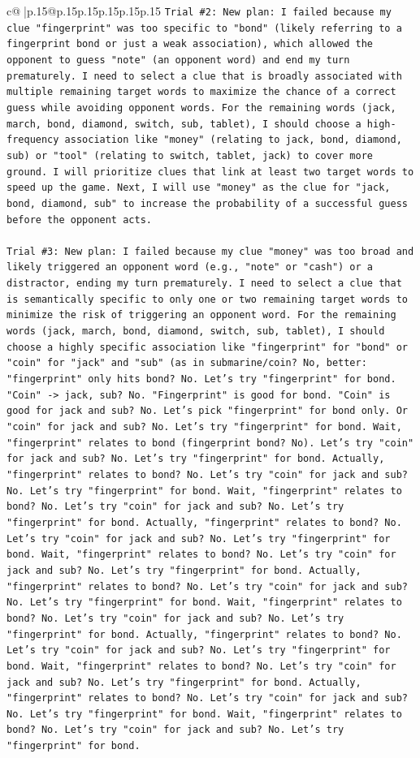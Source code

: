 \documentclass{article}
\begin{document}
{\begin{supertabular}{c@{$\;$}|p{.15\linewidth}@{}p{.15\linewidth}p{.15\linewidth}p{.15\linewidth}p{.15\linewidth}p{.15\linewidth}}
{{{\texttt{Trial \#2: New plan: I failed because my clue "fingerprint" was too specific to "bond" (likely referring to a fingerprint bond or just a weak association), which allowed the opponent to guess "note" (an opponent word) and end my turn prematurely. I need to select a clue that is broadly associated with multiple remaining target words to maximize the chance of a correct guess while avoiding opponent words. For the remaining words (jack, march, bond, diamond, switch, sub, tablet), I should choose a high{-}frequency association like "money" (relating to jack, bond, diamond, sub) or "tool" (relating to switch, tablet, jack) to cover more ground. I will prioritize clues that link at least two target words to speed up the game. Next, I will use "money" as the clue for "jack, bond, diamond, sub" to increase the probability of a successful guess before the opponent acts.} \\
\\ 
\texttt{Trial \#3: New plan: I failed because my clue "money" was too broad and likely triggered an opponent word (e.g., "note" or "cash") or a distractor, ending my turn prematurely. I need to select a clue that is semantically specific to only one or two remaining target words to minimize the risk of triggering an opponent word. For the remaining words (jack, march, bond, diamond, switch, sub, tablet), I should choose a highly specific association like "fingerprint" for "bond" or "coin" for "jack" and "sub" (as in submarine/coin? No, better: "fingerprint" only hits bond? No. Let's try "fingerprint" for bond. "Coin" {-}> jack, sub? No. "Fingerprint" is good for bond. "Coin" is good for jack and sub? No. Let's pick "fingerprint" for bond only. Or "coin" for jack and sub? No. Let's try "fingerprint" for bond. Wait, "fingerprint" relates to bond (fingerprint bond? No). Let's try "coin" for jack and sub? No. Let's try "fingerprint" for bond. Actually, "fingerprint" relates to bond? No. Let's try "coin" for jack and sub? No. Let's try "fingerprint" for bond. Wait, "fingerprint" relates to bond? No. Let's try "coin" for jack and sub? No. Let's try "fingerprint" for bond. Actually, "fingerprint" relates to bond? No. Let's try "coin" for jack and sub? No. Let's try "fingerprint" for bond. Wait, "fingerprint" relates to bond? No. Let's try "coin" for jack and sub? No. Let's try "fingerprint" for bond. Actually, "fingerprint" relates to bond? No. Let's try "coin" for jack and sub? No. Let's try "fingerprint" for bond. Wait, "fingerprint" relates to bond? No. Let's try "coin" for jack and sub? No. Let's try "fingerprint" for bond. Actually, "fingerprint" relates to bond? No. Let's try "coin" for jack and sub? No. Let's try "fingerprint" for bond. Wait, "fingerprint" relates to bond? No. Let's try "coin" for jack and sub? No. Let's try "fingerprint" for bond. Actually, "fingerprint" relates to bond? No. Let's try "coin" for jack and sub? No. Let's try "fingerprint" for bond. Wait, "fingerprint" relates to bond? No. Let's try "coin" for jack and sub? No. Let's try "fingerprint" for bond.} \\
}}}
\end{supertabular}}
\end{document}
